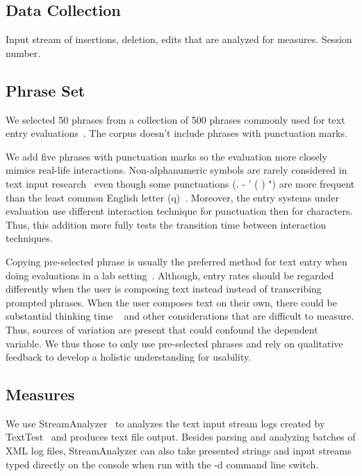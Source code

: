 \documentclass{sigchi}
\begin{document}
\subsection{Data Collection}
Input stream of insertions, deletion, edits that are analyzed for measures. Session number.

\subsection{Phrase Set}
We selected 50 phrases from a collection of 500 phrases commonly used for text entry evaluations~\cite{mackenzie2003phrase}.
The corpus doesn't include phrases with punctuation marks.  

We add five phrases with punctuation marks so the evaluation more closely mimics real-life interactions.
Non-alphanumeric symbols are rarely considered in text input research~\cite{mackenzie2003phrase} even though some punctuations (. - ' ( ) ") are more frequent than the least common English letter (q)~\cite{malikpunctuation}.
Moreover, the entry systems under evaluation use different interaction technique for punctuation then for characters.
Thus, this addition more fully tests the transition time between interaction techniques. 

Copying pre-selected phrase is usually the preferred method for text entry when doing evaluations in a lab setting~\cite{mackenzie2002character, mackenzie2003phrase}.
Although, entry rates should be regarded differently when the user is composing text instead instead of transcribing prompted phrases.
When the user composes text on their own, there could be substantial thinking time ~\cite{shneiderman2000limits} and other considerations that are difficult to measure.
Thus, sources of variation are present that could confound the  dependent variable.
We thus those to only use pre-selected phrases and rely on qualitative feedback to develop a holistic understanding for usability.

\subsection{Measures}
We use StreamAnalyzer~\cite{wobbrock2006analyzing} to  analyzes the text input stream logs created by TextTest~\cite{wobbrock2006analyzing} and produces text file output.
Besides parsing and analyzing batches of XML log files, StreamAnalyzer can also take presented strings and input streams typed directly on the console when run with the -d command line switch.
\end{document}
